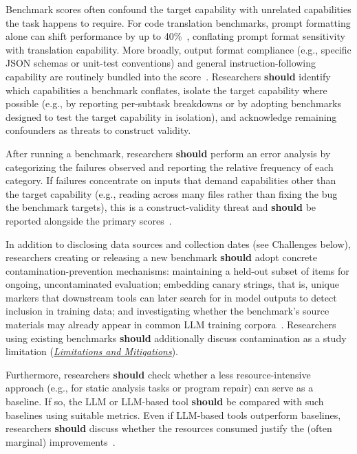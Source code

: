 \documentclass[smallextended]{svjour3}
\newcommand{\should}{\textbf{should}\xspace}
\newcommand{\limitationsmitigations}{\hyperref[sec:report-limitations-and-mitigations]{\emph{Limitations and Mitigations}}\xspace}
\newcommand{\limitationsmitigations}{\href{/guidelines\#report-limitations-and-mitigations}{\emph{Limitations and Mitigations}}\xspace}
\begin{document}
Benchmark scores often confound the target capability with unrelated capabilities the task happens to require. For code translation benchmarks, prompt formatting alone can shift performance by up to 40\%~\cite{DBLP:journals/corr/abs-2411-10541, cao2025should}, conflating prompt format sensitivity with translation capability. More broadly, output format compliance (e.g., specific JSON schemas or unit-test conventions) and general instruction-following capability are routinely bundled into the score~\cite{bean2025measuring}. Researchers \should identify which capabilities a benchmark conflates, isolate the target capability where possible (e.g., by reporting per-subtask breakdowns or by adopting benchmarks designed to test the target capability in isolation), and acknowledge remaining confounders as threats to construct validity.

After running a benchmark, researchers \should perform an error analysis by categorizing the failures observed and reporting the relative frequency of each category. If failures concentrate on inputs that demand capabilities other than the target capability (e.g., reading across many files rather than fixing the bug the benchmark targets), this is a construct-validity threat and \should be reported alongside the primary scores~\cite{bean2025measuring}.

In addition to disclosing data sources and collection dates (see Challenges below), researchers creating or releasing a new benchmark \should adopt concrete contamination-prevention mechanisms: maintaining a held-out subset of items for ongoing, uncontaminated evaluation; embedding canary strings, that is, unique markers that downstream tools can later search for in model outputs to detect inclusion in training data; and investigating whether the benchmark's source materials may already appear in common LLM training corpora~\cite{bean2025measuring, cao2025should}. Researchers using existing benchmarks \should additionally discuss contamination as a study limitation (\limitationsmitigations).

Furthermore, researchers \should check whether a less resource-intensive approach (e.g., for static analysis tasks or program repair) can serve as a baseline. If so, the LLM or LLM-based tool \should be compared with such baselines using suitable metrics. Even if LLM-based tools outperform baselines, researchers \should discuss whether the resources consumed justify the (often marginal) improvements~\cite{DBLP:journals/cacm/Menzies25}.
\end{document}
